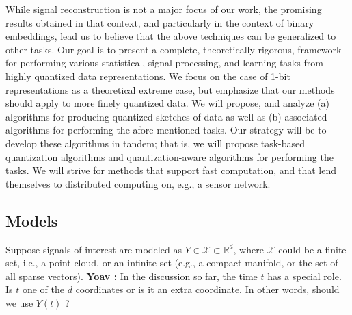 \documentclass{article}
\newcommand{\comment}[3]{{\color{#1} {\bf #2 :} #3}}
\newcommand{\yoav}[1]{\comment{magenta}{Yoav}{#1}}
\newcommand{\rayan}[1]{\comment{red}{Rayan}{#1}}
\begin{document}
While signal reconstruction is not a major focus of our work, the promising results obtained in that context, and particularly in the context of binary embeddings, lead us to believe that the above techniques can be generalized to other tasks. 
Our goal  is to present a complete, theoretically rigorous, framework for performing various statistical, signal processing, and learning tasks from highly quantized data representations. We focus on the case of 1-bit representations as a theoretical extreme case, but emphasize that our methods should apply to more finely quantized data. We will propose, and analyze  (a) algorithms for  producing quantized sketches of data as well as (b) associated algorithms for performing the afore-mentioned tasks. Our strategy will be to develop these algorithms in tandem; that is, we will propose task-based quantization algorithms and quantization-aware algorithms for performing the tasks. We will strive for methods that support fast computation, and that lend themselves to distributed computing on, e.g., a sensor network.

\subsection{Models}
Suppose signals of interest are modeled as $Y\in \mathcal{X} \subset
\mathbb{R}^d$, where $\mathcal{X}$ could be a finite set, i.e., a
point cloud, or an infinite set (e.g., a compact manifold, or the set
of all sparse vectors).\yoav{In the discussion so far, the time $t$
  has a special role. Is $t$ one of the $d$ coordinates or is it an
  extra coordinate. In other words, should we use $Y(t)$ ?}
\end{document}
